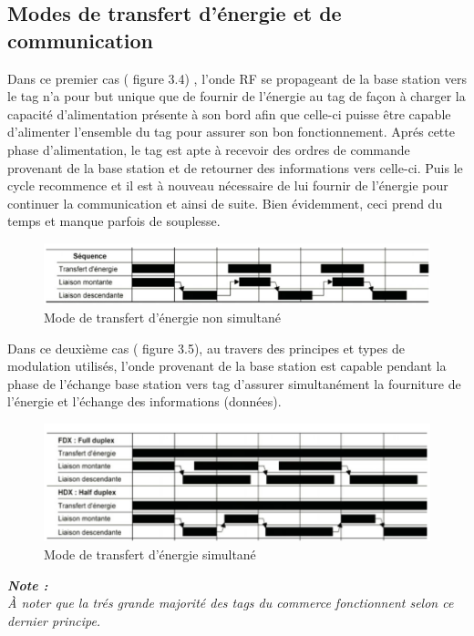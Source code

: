 \documentclass[11pt, a4paper, twoside]{book}
\begin{document}
\subsection{Modes de transfert d’énergie et de communication}
Dans ce premier cas ( figure 3.4) , l’onde RF se propageant de la base station vers le tag n’a pour but unique que de fournir de l’énergie au tag de façon à charger la  capacité d’alimentation  présente à son bord afin que celle-ci puisse être capable d’alimenter l’ensemble du tag pour assurer son bon fonctionnement. Aprés cette phase d'alimentation, le tag est apte à recevoir des ordres de commande provenant de la base station et de retourner des informations vers celle-ci. Puis le cycle recommence et il est à nouveau nécessaire de lui fournir de l'énergie pour continuer la communication et ainsi de suite. Bien évidemment, ceci prend du temps et manque parfois de souplesse.\\
\begin{figure}[H]
\centering
\includegraphics[width=\textwidth]{figa}
\caption{Mode de transfert d'énergie non simultané}
\end{figure}

Dans ce deuxième cas ( figure 3.5), au travers des principes et types de modulation utilisés, l'onde provenant de la base station est capable pendant la phase de l'échange base station vers tag d'assurer simultanément la fourniture de l'énergie et l'échange des informations (données).\\

\begin{figure}[H]
\centering
\includegraphics[width=\textwidth]{figb}
\caption{Mode de transfert d'énergie simultané}
\end{figure}

\begin{center}
\textbf{\emph{Note :}}\\
\emph{À noter que la trés grande majorité des tags du commerce fonctionnent selon ce dernier principe.}
\end{center}
\end{document}

